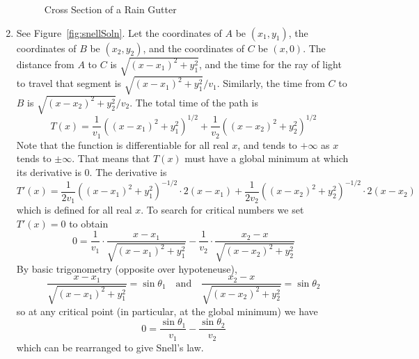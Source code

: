 \documentclass{article}
\begin{document}
\begin{enumerate}
\begin{figure}[htbp]
    \caption{Cross Section of a Rain Gutter}
    \label{fig:gutterSoln}
  \end{figure}
\item %
  See Figure~\ref{fig:snellSoln}.  Let the coordinates of $A$ be
  $(x_1,y_1)$, the coordinates of $B$ be $(x_2,y_2)$, and the
  coordinates of $C$ be $(x,0)$.  The distance from $A$ to $C$ is
  $\sqrt{(x-x_1)^2 + y_1^2}$, and the time for the ray of light to
  travel that segment is $\sqrt{(x-x_1)^2+y_1^2}/v_1$.  Similarly, the
  time from $C$ to $B$ is $\sqrt{(x-x_2)^2+y_2^2}/v_2$.  The total
  time of the path is
  \begin{displaymath}
    T(x) = \frac{1}{v_1} ( (x-x_1)^2 + y_1^2)^{1/2}
    + \frac{1}{v_2} ( (x-x_2)^2 + y_2^2)^{1/2}
  \end{displaymath}
  Note that the function is differentiable for all real $x$, and tends
  to $+\infty$ as $x$ tends to $\pm\infty$.  That means that $T(x)$
  must have a global minimum at which its derivative is $0$.  The
  derivative is
  \begin{displaymath}
    T'(x) = \frac{1}{2v_1} ( (x-x_1)^2 + y_1^2)^{-1/2} \cdot 2(x-x_1)
    + \frac{1}{2v_2} ( (x-x_2)^2 + y_2^2 )^{-1/2} \cdot 2(x-x_2)
  \end{displaymath}
  which is defined for all real $x$.  To search for critical numbers
  we set $T'(x)=0$ to obtain
  \begin{displaymath}
    0 = \frac{1}{v_1} \cdot \frac{x-x_1}{\sqrt{(x-x_1)^2+y_1^2}}
    - \frac{1}{v_2} \cdot \frac{x_2-x}{\sqrt{(x-x_2)^2+y_2^2}}
  \end{displaymath}
  By basic trigonometry (opposite over hypoteneuse),
  \begin{displaymath}
    \frac{x-x_1}{\sqrt{(x-x_1)^2+y_1^2}} = \sin\theta_1
    \quad\mbox{and}\quad
    \frac{x_2-x}{\sqrt{(x-x_2)^2+y_2^2}} = \sin\theta_2
  \end{displaymath}
  so at any critical point (in particular, at the global minimum) we
  have
  \begin{displaymath}
    0 = \frac{\sin\theta_1}{v_1} - \frac{\sin\theta_2}{v_2}
  \end{displaymath}
  which can be rearranged to give Snell's law.

\end{enumerate}
\end{document}
